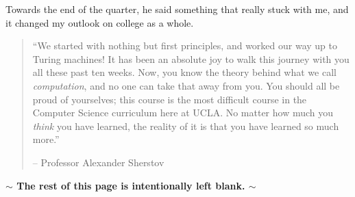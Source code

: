 \documentclass[11pt]{article}
\renewcommand{\it}[1]{\textit{{#1}}}
\renewcommand{\bf}[1]{\textbf{{#1}}}
\begin{document}
Towards the end of the quarter, he said something that really stuck with me, and
it changed my outlook on college as a whole.
\begin{quote}
  ``We started with nothing but first principles, and worked our way up to
  Turing machines! It has been an absolute joy to walk this journey with you all
  these past ten weeks. Now, you know the theory behind what we call
  \it{computation}, and no one can take that away from you. You should all be
  proud of yourselves; this course is the most difficult course in the Computer
  Science curriculum here at UCLA. No matter how much you \it{think} you have
  learned, the reality of it is that you have learned so
  much more.''
  \vspace{-1em}
  \begin{flushright}
    -- Professor Alexander Sherstov
  \end{flushright}
\end{quote}
\begin{center}
  \vspace{5em}
  \bf{$\bm{\sim}$ The rest of this page is intentionally left blank. $\bm{\sim}$}
\end{center}

\newpage
\end{document}
